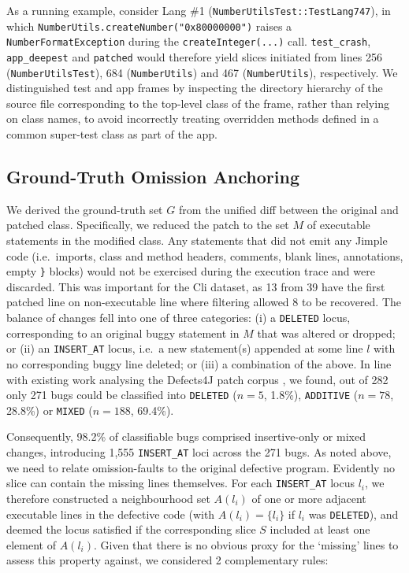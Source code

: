 \documentclass[sigconf,nonacm]{acmart}
\begin{document}
As a running example, 
\newline
consider Lang \#1 (\texttt{NumberUtilsTest::\-TestLang747}), in which 
\newline
\texttt{NumberUtils.\allowbreak createNumber("0x80000000")} raises a \texttt{Number\-Format\-Exception} during the \newline
\texttt{createInteger(...)} call. \texttt{test\_\allowbreak crash}, \texttt{app\_\allowbreak deepest} and \newline
\texttt{patched} would therefore yield slices initiated from lines 256 (\texttt{Number\allowbreak Utils\allowbreak Test}), 684 (\texttt{Number\allowbreak Utils}) and 467 (\texttt{Number\allowbreak Utils}), respectively. We distinguished test and app frames by inspecting the directory hierarchy of the source file corresponding to the top-level class of the frame, rather than relying on class names, to avoid incorrectly treating overridden methods defined in a common super-test class as part of the app.

\subsection{Ground-Truth Omission Anchoring}

We derived the ground-truth set $G$ from the unified diff between the original and patched class. Specifically, we reduced the patch to the set $M$ of executable statements in the modified class. Any statements that did not emit any Jimple code (i.e.\ imports, class and method headers, comments, blank lines, annotations, empty \texttt{\}} blocks) would not be exercised during the execution trace and were discarded. This was important for the Cli dataset, as 13 from 39 have the first patched line on non-executable line where filtering allowed 8 to be recovered. The balance of changes fell into one of three categories: (i) a \texttt{DELETED} locus, corresponding to an original buggy statement in $M$ that was altered or dropped; or (ii) an \texttt{INSERT\_AT} locus, i.e.\ a new statement(s) appended at some line $l$ with no corresponding buggy line deleted; or (iii) a combination of the above. In line with existing work analysing the Defects4J patch corpus \cite{Pearson2017Evaluating, Reis2019Demystifying, Sobreira2018Dissection}, we found, out of 282 only 271 bugs could be classified into \texttt{DELETED} ($n=5$, 1.8\%), \texttt{ADDITIVE} ($n=78$, 28.8\%) or \texttt{MIXED} ($n=188$, 69.4\%).

Consequently, 98.2\% of classifiable bugs comprised insertive-only or mixed changes, introducing 1,555 \texttt{INSERT\_AT} loci across the 271 bugs. As noted above, we need to relate omission-faults to the original defective program. Evidently no slice can contain the missing lines themselves. For each \texttt{INSERT\_AT} locus $l_i$, we therefore constructed a neighbourhood set $A(l_i)$ of one or more adjacent executable lines in the defective code (with $A(l_i)=\{l_i\}$ if $l_i$ was \texttt{DELETED}), and deemed the locus satisfied if the corresponding slice $S$ included at least one element of $A(l_i)$. Given that there is no obvious proxy for the `missing' lines to assess this property against, we considered 2 complementary rules:
\end{document}
